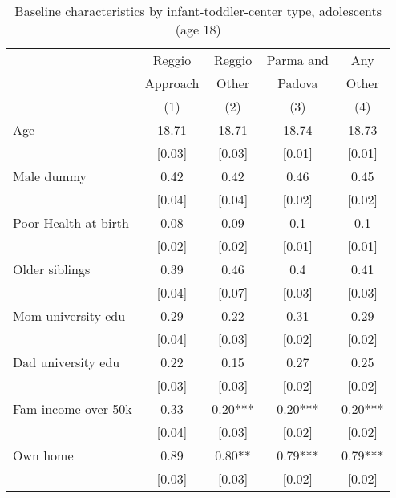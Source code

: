 \begin{table}[H]
\caption{Baseline characteristics by infant-toddler-center type, adolescents (age 18)}
\label{tab:adol_CONTROLasilo}
\centering
\small
\begin{tabular}{l cccc}
\hline \hline 
 & Reggio & Reggio & Parma and & Any \\
 & Approach & Other & Padova & Other \\
 &   (1)    &  (2)  & (3)    &  (4) \\
\hline 

Age   &   18.71   &   18.71   &   18.74   &   18.73 \\ 
   &   [0.03]   &   [0.03]   &   [0.01]   &   [0.01] \\ 
Male dummy   &   0.42   &   0.42   &   0.46   &   0.45 \\ 
   &   [0.04]   &   [0.04]   &   [0.02]   &   [0.02] \\ 
Poor Health at birth   &   0.08   &   0.09   &   0.1   &   0.1 \\ 
   &   [0.02]   &   [0.02]   &   [0.01]   &   [0.01] \\ 
Older siblings   &   0.39   &   0.46   &   0.4   &   0.41 \\ 
   &   [0.04]   &   [0.07]   &   [0.03]   &   [0.03] \\ 
Mom university edu   &   0.29   &   0.22   &   0.31   &   0.29 \\ 
   &   [0.04]   &   [0.03]   &   [0.02]   &   [0.02] \\ 
Dad university edu   &   0.22   &   0.15   &   0.27   &   0.25 \\ 
   &   [0.03]   &   [0.03]   &   [0.02]   &   [0.02] \\ 
Fam income over 50k   &   0.33   &   0.20***   &   0.20***   &   0.20*** \\ 
   &   [0.04]   &   [0.03]   &   [0.02]   &   [0.02] \\ 
Own home   &   0.89   &   0.80**   &   0.79***   &   0.79*** \\ 
   &   [0.03]   &   [0.03]   &   [0.02]   &   [0.02] \\ 

\end{tabular}
\end{table}
